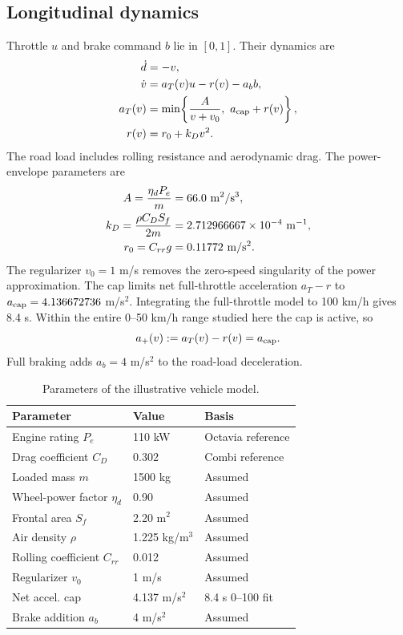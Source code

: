 \documentclass[journal,a4paper,twocolumn]{IEEEtran}
\begin{document}
\subsection{Longitudinal dynamics}
Throttle $u$ and brake command $b$ lie in $[0,1]$. Their dynamics are
\begin{align}
 \dot d&=-v,\label{eq:dynamics_d}\\
 \dot v&=a_T(v)u-r(v)-a_b b,\label{eq:dynamics_v}\\
 a_T(v)&=\min\!\left\{\frac{A}{v+v_0},\ a_{\rm cap}+r(v)\right\},\label{eq:traction}\\
 r(v)&=r_0+k_Dv^2.\label{eq:road}
\end{align}
The road load includes rolling resistance and aerodynamic drag. The power-envelope parameters are
\begin{align}
 A=\frac{\eta_dP_e}{m}&=66.0\ \mathrm{m^2/s^3},\notag\\
 k_D=\frac{\rho C_DS_f}{2m}&=2.712966667\times10^{-4}\ \mathrm{m^{-1}},\notag\\
 r_0=C_{rr}g&=0.11772\ \mathrm{m/s^2}.
 \label{eq:mechpar}
\end{align}
The regularizer $v_0=1$ m/s removes the zero-speed singularity of the power approximation. The cap limits net full-throttle acceleration $a_T-r$ to $a_{\rm cap}=4.136672736$ m/s$^2$. Integrating the full-throttle model to 100 km/h gives 8.4 s. Within the entire 0--50 km/h range studied here the cap is active, so
\begin{equation}
 a_+(v):=a_T(v)-r(v)=a_{\rm cap}.
 \label{eq:aplus}
\end{equation}
Full braking adds $a_b=4$ m/s$^2$ to the road-load deceleration.

\begin{table}[!t]
\centering
\caption{Parameters of the illustrative vehicle model.}
\label{tab:car}
\begingroup\footnotesize\setlength{\tabcolsep}{3pt}
\begin{tabular}{@{}p{1.16in}p{0.80in}p{1.13in}@{}}
\toprule
Parameter & Value & Basis\\
\midrule
Engine rating $P_e$ & 110 kW & Octavia reference \cite{skoda}\\
Drag coefficient $C_D$ & 0.302 & Combi reference \cite{skoda}\\
Loaded mass $m$ & 1500 kg & Assumed\\
Wheel-power factor $\eta_d$ & 0.90 & Assumed\\
Frontal area $S_f$ & 2.20 m$^2$ & Assumed\\
Air density $\rho$ & 1.225 kg/m$^3$ & Assumed\\
Rolling coefficient $C_{rr}$ & 0.012 & Assumed\\
Regularizer $v_0$ & 1 m/s & Assumed\\
Net accel. cap & 4.137 m/s$^2$ & 8.4 s 0--100 fit\\
Brake addition $a_b$ & 4 m/s$^2$ & Assumed\\
\bottomrule
\end{tabular}\endgroup
\end{table}
\end{document}
